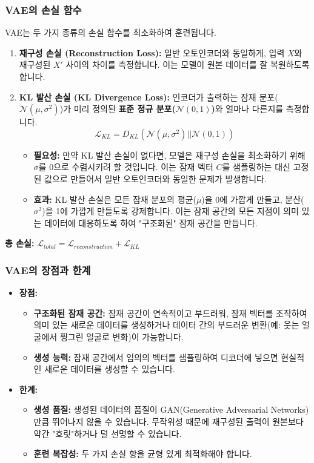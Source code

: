\documentclass[11pt,a4paper]{article}
\theoremstyle{definition}
\begin{document}
\subsubsection{VAE의 손실 함수}
VAE는 두 가지 종류의 손실 함수를 최소화하여 훈련됩니다.
\begin{enumerate}
    \item \textbf{재구성 손실 (Reconstruction Loss):} 일반 오토인코더와 동일하게, 입력 $X$와 재구성된 $X'$ 사이의 차이를 측정합니다. 이는 모델이 원본 데이터를 잘 복원하도록 합니다.
    \item \textbf{KL 발산 손실 (KL Divergence Loss):} 인코더가 출력하는 잠재 분포($\mathcal{N}(\mu, \sigma^2)$)가 미리 정의된 \textbf{표준 정규 분포($\mathcal{N}(0, 1)$)}와 얼마나 다른지를 측정합니다.
    \[ \mathcal{L}_{KL} = D_{KL}(\mathcal{N}(\mu, \sigma^2) || \mathcal{N}(0, 1)) \]
    \begin{itemize}
        \item \textbf{필요성:} 만약 KL 발산 손실이 없다면, 모델은 재구성 손실을 최소화하기 위해 $\sigma$를 0으로 수렴시키려 할 것입니다. 이는 잠재 벡터 $C$를 샘플링하는 대신 고정된 값으로 만들어서 일반 오토인코더와 동일한 문제가 발생합니다.
        \item \textbf{효과:} KL 발산 손실은 모든 잠재 분포의 평균($\mu$)을 0에 가깝게 만들고, 분산($\sigma^2$)을 1에 가깝게 만들도록 강제합니다. 이는 잠재 공간의 모든 지점이 의미 있는 데이터에 대응하도록 하여 "구조화된" 잠재 공간을 만듭니다.
    \end{itemize}
\end{enumerate}
\textbf{총 손실:} $\mathcal{L}_{total} = \mathcal{L}_{reconstruction} + \mathcal{L}_{KL}$

\subsubsection{VAE의 장점과 한계}
\begin{itemize}
    \item \textbf{장점:}
    \begin{itemize}
        \item \textbf{구조화된 잠재 공간:} 잠재 공간이 연속적이고 부드러워, 잠재 벡터를 조작하여 의미 있는 새로운 데이터를 생성하거나 데이터 간의 부드러운 변환(예: 웃는 얼굴에서 찡그린 얼굴로 변화)이 가능합니다.
        \item \textbf{생성 능력:} 잠재 공간에서 임의의 벡터를 샘플링하여 디코더에 넣으면 현실적인 새로운 데이터를 생성할 수 있습니다.
    \end{itemize}
    \item \textbf{한계:}
    \begin{itemize}
        \item \textbf{생성 품질:} 생성된 데이터의 품질이 GAN(Generative Adversarial Networks)만큼 뛰어나지 않을 수 있습니다. 무작위성 때문에 재구성된 출력이 원본보다 약간 "흐릿"하거나 덜 선명할 수 있습니다.
        \item \textbf{훈련 복잡성:} 두 가지 손실 항을 균형 있게 최적화해야 합니다.
    \end{itemize}
\end{itemize}
\end{document}

